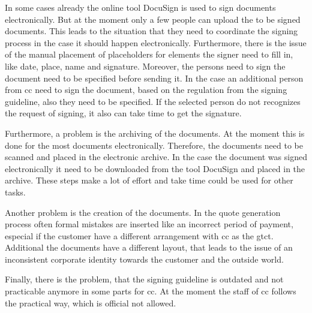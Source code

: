 In some cases already the online tool DocuSign is used to sign documents electronically. But at the moment only a few people can upload the to be signed documents. This leads to the situation that they need to coordinate the signing process in the case it should happen electronically. Furthermore, there is the issue of the manual placement of placeholders for elements the signer need to fill in, like date, place, name and signature. Moreover, the persons need to sign the document need to be specified before sending it. In the case an additional person from \gls{cc} need to sign the document, based on the regulation from the signing guideline, also they need to be specified. If the selected person do not recognizes the request of signing, it also can take time to get the signature.

Furthermore, a problem is the archiving of the documents. At the moment this is done for the most documents electronically. Therefore, the documents need to be scanned and placed in the electronic archive. In the case the document was signed electronically it need to be downloaded from the tool DocuSign and placed in the archive. These steps make a lot of effort and take time could be used for other tasks.

Another problem is the creation of the documents. In the quote generation process often formal mistakes are inserted like an incorrect period of payment, especial if the customer have a different arrangement with \gls{cc} as the \gls{gtct}. Additional the documents have a different layout, that leads to the issue of an inconsistent corporate identity towards the customer and the outside world.

Finally, there is the problem, that the signing guideline is outdated and not practicable anymore in some parts for \gls{cc}. At the moment the staff of \gls{cc} follows the practical way, which is official not allowed. 
